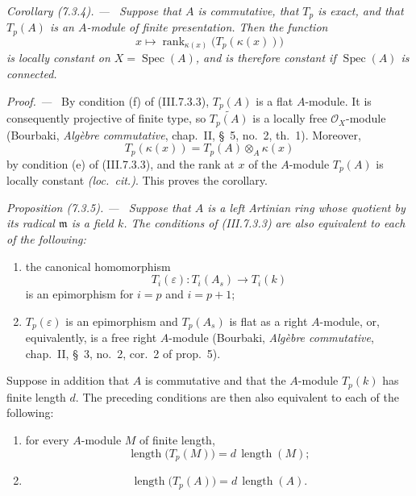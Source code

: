 \documentclass[10pt,oneside]{book}
\newcommand{\sh}[1]{\mathscr{#1}}
\newcommand{\kres}{\kappa}
\newcommand{\Spec}{\operatorname{Spec}}
\newcommand{\sref}[2][]{(#2)}
\newcommand{\oldpage}[2][]{\setcounter{footnote}{0}\marginpar{\scriptsize\textbf{#1}~|~#2}\ignorespaces}
\newenvironment{proposition}[1][]{\par\medskip\noindent\itshape Proposition (#1). ---\ }{\par}
\newenvironment{corollary}[1][]{\par\medskip\noindent\itshape Corollary (#1). ---\ }{\par}
\newenvironment{proof}{\par\medskip\noindent\textit{Proof. ---\ }}{\par}
\begin{document}
\oldpage[III]{182}

\begin{corollary}[7.3.4]
\label{III.7.3.4}
Suppose that $A$ is commutative, that $T_p$ is exact, and that
$T_p(A)$ is an $A$-module of finite presentation.  Then the
function
\[
  x\longmapsto
  \operatorname{rank}_{\kres(x)}
  \bigl(T_p(\kres(x))\bigr)
\]
is locally constant on $X=\Spec(A)$, and is therefore constant
if $\Spec(A)$ is connected.
\end{corollary}

\begin{proof}
By condition (f) of \sref{III.7.3.3}, $T_p(A)$ is a flat
$A$-module.  It is consequently projective of finite type, so
$\widetilde{T_p(A)}$ is a locally free $\sh O_X$-module
(Bourbaki, \emph{Alg\`ebre commutative}, chap.~II, \S~5,
no.~2, th.~1).  Moreover,
\[
  T_p(\kres(x))
  =
  T_p(A)\otimes_A\kres(x)
\]
by condition (e) of \sref{III.7.3.3}, and the rank at $x$ of
the $A$-module $T_p(A)$ is locally constant
\emph{(loc.\ cit.)}.  This proves the corollary.
\end{proof}

\begin{proposition}[7.3.5]
\label{III.7.3.5}
Suppose that $A$ is a left Artinian ring whose quotient by its
radical $\mathfrak m$ is a field $k$.  The conditions of
\sref{III.7.3.3} are also equivalent to each of the following:
\begin{enumerate}
  \item[(g)] the canonical homomorphism
    \[
      T_i(\varepsilon):T_i(A_s)\longrightarrow T_i(k)
    \]
    is an epimorphism for $i=p$ and $i=p+1$;
  \item[(h)] $T_p(\varepsilon)$ is an epimorphism and
    $T_p(A_s)$ is flat as a right $A$-module, or, equivalently,
    is a free right $A$-module (Bourbaki,
    \emph{Alg\`ebre commutative}, chap.~II, \S~3, no.~2,
    cor.~2 of prop.~5).
\end{enumerate}
Suppose in addition that $A$ is commutative and that the
$A$-module $T_p(k)$ has finite length $d$.  The preceding
conditions are then also equivalent to each of the following:
\begin{enumerate}
  \item[(i)] for every $A$-module $M$ of finite length,
    \[
      \operatorname{length}\bigl(T_p(M)\bigr)
      =
      d\,\operatorname{length}(M);
      \tag{7.3.5.1}\label{III.7.3.5.1.eq}
    \]
  \item[(j)]
    \[
      \operatorname{length}\bigl(T_p(A)\bigr)
      =
      d\,\operatorname{length}(A).
      \tag{7.3.5.2}\label{III.7.3.5.2.eq}
    \]
\end{enumerate}
\end{proposition}
\end{document}
